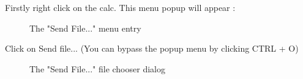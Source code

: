 \documentclass[10pt]{report}
\begin{document}
Firstly right click on the calc.\newline
This menu popup will appear : \newline
\begin{figure}[H]
\centering
{}
\caption{The "Send File..." menu entry}
\end{figure}
Click on Send file...\newline
(You can bypass the popup menu by clicking CTRL + O)\newline
\begin{figure}[H]
\centering
{}
\caption{The "Send File..." file chooser dialog}
\end{figure}
\end{document}
